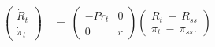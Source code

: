 \begin{equation}
\begin{split}
    \begin{pmatrix}
        \dot{R}_{t} \\
        \dot{\pi}_{t}
    \end{pmatrix} \ 
    & = \ 
    \begin{pmatrix}
        -Pr_{t} & 0 \\
        0 & r
    \end{pmatrix}
    \begin{pmatrix}
        R_{t} \ - \ R_{ss} \\
        \pi_{t} \ - \ \pi_{ss}.
    \end{pmatrix}
\end{split}
\label{Equation:Social-Planners-Problem_Linearized-System-of-Equations-near-Steady-State}
\end{equation}